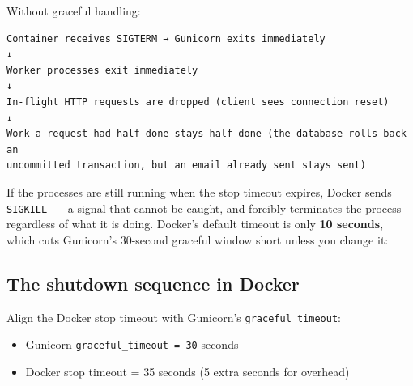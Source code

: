 \noindent{}Without graceful handling:

\begin{outputbox}[short]
\begin{Verbatim}[fontsize=\codesize, breaklines, breakanywhere, breaksymbolleft={\tiny\textcolor{muted}{$\hookrightarrow$}}]
Container receives SIGTERM → Gunicorn exits immediately
↓
Worker processes exit immediately
↓
In-flight HTTP requests are dropped (client sees connection reset)
↓
Work a request had half done stays half done (the database rolls back an
uncommitted transaction, but an email already sent stays sent)
\end{Verbatim}
\end{outputbox}

\noindent{}If the processes are still running when the stop timeout expires, Docker sends \texttt{SIGKILL}~--- a signal that cannot be caught, and forcibly terminates the process regardless of what it is doing. Docker's default timeout is only \textbf{10 seconds}, which cuts Gunicorn's 30-second graceful window short unless you change it:

\subsection*{The shutdown sequence in Docker}\label{24-process-startup:the-shutdown-sequence-in-docker}

\begin{codebox}[short]

\begin{Shaded}
\begin{Highlighting}[]

\end{Highlighting}
\end{Shaded}

\end{codebox}

\noindent{}Align the Docker stop timeout with Gunicorn's \texttt{graceful\_timeout}:

\begin{itemize}
\tightlist
\item
  Gunicorn \texttt{graceful\_timeout\ =}\allowbreak{}\texttt{\ 30} seconds
\item
  Docker stop timeout = 35 seconds (5 extra seconds for overhead)
\end{itemize}

